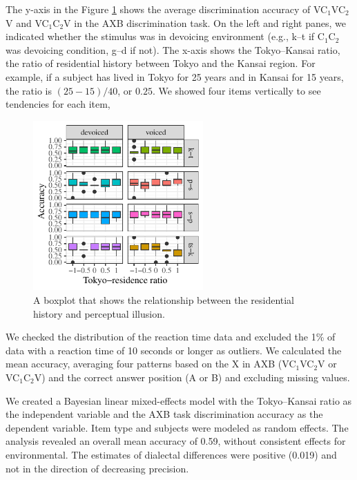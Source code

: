 \documentclass[a4paper,11pt,twocolumn]{article}
\begin{document}
The y-axis in the Figure \ref{fig:axb_results} shows the average discrimination accuracy of VC$_\text{1}$VC$_\text{2}$V and VC$_\text{1}$C$_\text{2}$V in the AXB discrimination task. On the left and right panes, we indicated whether the stimulus was in devoicing environment (e.g., k--t if C$_\text{1}$C$_\text{2}$ was devoicing condition, g--d if not). The x-axis shows the Tokyo--Kansai ratio, the ratio of residential history between Tokyo and the Kansai region. For example, if a subject has lived in Tokyo for 25 years and in Kansai for 15 years, the ratio is $(25-15)/40$, or $0.25$. We showed four items vertically to see tendencies for each item,
\begin{figure}[!ht]
\begin{center}
\includegraphics[width=6.5cm]{../results/artifact/results_axb_allophone.pdf}
\caption{A boxplot that shows the relationship between the residential history and perceptual illusion.}\label{fig:axb_results}
\end{center}
\end{figure}

We checked the distribution of the reaction time data and excluded the 1\% of data with a reaction time of 10 seconds or longer as outliers. We calculated the mean accuracy, averaging four patterns based on the X in AXB (VC$_\text{1}$VC$_\text{2}$V or VC$_\text{1}$C$_\text{2}$V) and the correct answer position (A or B) and excluding missing values.

We created a Bayesian linear mixed-effects model \cite{lme4, rstanarm, easystats} with the Tokyo--Kansai ratio as the independent variable and the AXB task discrimination accuracy as the dependent variable. Item type and subjects were modeled as random effects. The analysis revealed an overall mean accuracy of 0.59, without consistent effects for environmental. The estimates of dialectal differences were positive (0.019) and not in the direction of decreasing precision.
\end{document}
